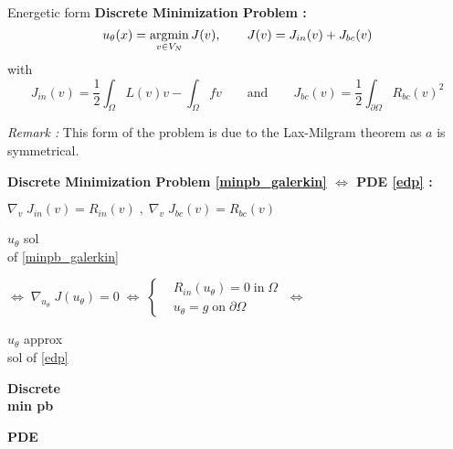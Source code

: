\begin{frame}{Energetic form}
	\textbf{Discrete Minimization Problem :}
	\begin{equation}
		\displaystyle u_\theta(x)=\operatorname*{argmin}_{v\in V_N} J(v), \qquad J(v)=J_{in}(v)+J_{bc}(v)\label{minpb_galerkin}
	\end{equation}
	with 
	\begin{equation*}
		J_{in}(v)=\frac{1}{2}\int_\Omega L(v)v - \int_\Omega fv  \qquad \text{and} \qquad J_{bc}(v)=\frac{1}{2}\int_{\partial\Omega} R_{bc}(v)^2
	\end{equation*}

	\footnotesize	
	\textit{Remark :} This form of the problem is due to the Lax-Milgram theorem as $a$ is symmetrical.
	\normalsize
	
	\footnotesize
	\begin{center}
		\begin{tcolorbox}[
			colback=white, %
			colframe=other, %
			arc=2mm, %
			boxrule=0.5pt, %
			breakable, enhanced jigsaw,
			width=0.8\linewidth
			]
			
			\textbf{Discrete Minimization Problem \eqref{minpb_galerkin} $\Leftrightarrow$ PDE \eqref{edp} :}
			
			\centering
			$\nabla_v \; J_{in}(v)=R_{in}(v) \; , \; \nabla_v \; J_{bc}(v)=R_{bc}(v) \qquad $  
			
			\vspace{5pt}
			
			\begin{minipage}{0.1\linewidth}
				\centering
				$u_\theta$ sol \\
				of \eqref{minpb_galerkin}
			\end{minipage} $\Leftrightarrow \; \nabla_{u_\theta} \; J(u_\theta)=0 \; \Leftrightarrow \; \left\{\begin{aligned}
				&R_{in}(u_\theta)=0 \; \text{in} \; \Omega \\
				&u_\theta=g \; \text{on} \; \partial\Omega
			\end{aligned}\right. \; \Leftrightarrow$ \begin{minipage}{0.15\linewidth}
				\centering
				$u_\theta$ approx \\
				sol of \eqref{edp}
			\end{minipage}
		
			\vspace{5pt}
			
			\begin{minipage}{0.1\linewidth}
				\centering
				\textbf{Discrete} \\
				\textbf{min pb}
			\end{minipage} \; \hspace{160pt} \; \begin{minipage}{0.1\linewidth}
				\centering
				\textbf{PDE}
			\end{minipage}
		\end{tcolorbox}
	\end{center}
\end{frame}

